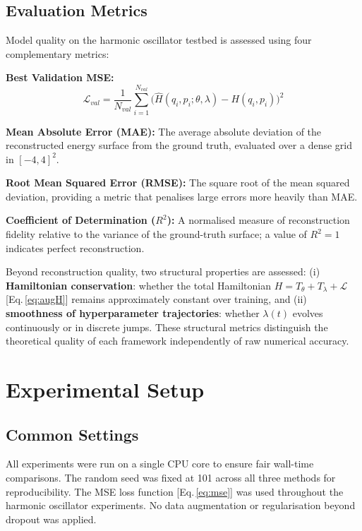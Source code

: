 \documentclass[12pt,a4paper]{article}
\begin{document}
\subsection{Evaluation Metrics}

Model quality on the harmonic oscillator testbed is assessed using four
complementary metrics:

\textbf{Best Validation MSE:}
\begin{equation}
\mathcal{L}_{val} = \frac{1}{N_{val}}\sum_{i=1}^{N_{val}}
  \bigl(\hat{H}(q_i,p_i;\theta,\lambda) - H(q_i,p_i)\bigr)^2
\label{eq:mse}
\end{equation}

\textbf{Mean Absolute Error (MAE):}  The average absolute deviation
of the reconstructed energy surface from the ground truth, evaluated
over a dense grid in $[-4,4]^2$.

\textbf{Root Mean Squared Error (RMSE):}  The square root of the
mean squared deviation, providing a metric that penalises large errors
more heavily than MAE.

\textbf{Coefficient of Determination ($R^2$):}  A normalised measure
of reconstruction fidelity relative to the variance of the ground-truth
surface; a value of $R^2 = 1$ indicates perfect reconstruction.

Beyond reconstruction quality, two structural properties are assessed:
(i) \textbf{Hamiltonian conservation}: whether the total Hamiltonian
$H = T_\theta + T_\lambda + \mathcal{L}$ [Eq.\,\eqref{eq:augH}] remains
approximately constant over training, and (ii)
\textbf{smoothness of hyperparameter trajectories}: whether $\lambda(t)$
evolves continuously or in discrete jumps.  These structural metrics
distinguish the theoretical quality of each framework independently of
raw numerical accuracy.


\section{Experimental Setup}
\label{sec:setup}

\subsection{Common Settings}

All experiments were run on a single CPU core to ensure fair
wall-time comparisons.  The random seed was fixed at 101 across all
three methods for reproducibility.  The MSE loss function
[Eq.\,\eqref{eq:mse}] was used throughout the harmonic oscillator
experiments.  No data augmentation or regularisation beyond dropout
was applied.
\end{document}
